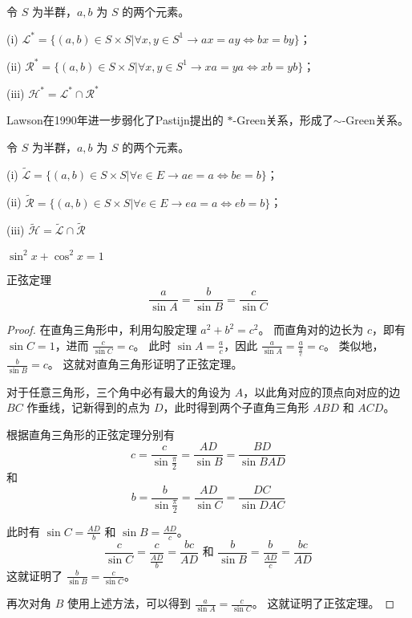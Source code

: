 \begin{definition}
    令 $S$ 为半群，$a, b$ 为 $S$ 的两个元素。

    (i) $\mathcal{L}^{\ast} = \{(a,b)\in S\times S| \forall x,y \in S^1 \rightarrow ax=ay \Leftrightarrow bx=by\}$；

    (ii) $\mathcal{R}^{\ast} = \{(a,b)\in S\times S| \forall x,y \in S^1 \rightarrow xa=ya \Leftrightarrow xb=yb\}$；

    (iii) $\mathcal{H}^{\ast} = \mathcal{L}^{\ast} \cap \mathcal{R}^{\ast}$
\end{definition}

Lawson在1990年进一步弱化了Pastijn提出的 $\ast$-Green关系，形成了$\sim$-Green关系。

\begin{definition}
    令 $S$ 为半群，$a, b$ 为 $S$ 的两个元素。

    (i) $\tilde{\mathcal{L}} = \{(a,b)\in S\times S| \forall e \in E \rightarrow ae=a \Leftrightarrow be=b\}$；

    (ii) $\tilde{\mathcal{R}} = \{(a,b)\in S\times S| \forall e \in E \rightarrow ea=a \Leftrightarrow eb=b\}$；

    (iii) $\tilde{\mathcal{H}} = \tilde{\mathcal{L}} \cap \tilde{\mathcal{R}}$
\end{definition}

\begin{axiom}
    $\sin^2 x + \cos^2 x = 1$
\end{axiom}

\begin{proposition} 正弦定理
    \[
        \frac{a}{\sin A} = \frac{b}{\sin B} = \frac{c}{\sin C}
    \]
    \begin{proof}
        在直角三角形中，利用勾股定理 $a^2 + b^2 = c^2$。
        而直角对的边长为 $c$，即有 $\sin C = 1$，进而 $\frac{c}{\sin C} = c$。
        此时 $\sin A = \frac{a}{c}$，因此 $\frac{a}{\sin A} = \frac{a}{\frac{a}{c}} = c$。
        类似地，$\frac{b}{\sin B} = c$。
        这就对直角三角形证明了正弦定理。

        对于任意三角形，三个角中必有最大的角设为 $A$，以此角对应的顶点向对应的边 $BC$ 作垂线，记新得到的点为 $D$，此时得到两个子直角三角形 $ABD$ 和 $ACD$。
        
        根据直角三角形的正弦定理分别有
        \[
            c = \frac{c}{\sin \frac{\pi}{2}} = \frac{AD}{\sin B} = \frac{BD}{\sin BAD}
        \]
        和
        \[
            b = \frac{b}{\sin \frac{\pi}{2}} = \frac{AD}{\sin C} = \frac{DC}{\sin DAC}
        \]
        
        此时有 $\sin C = \frac{AD}{b}$ 和 $\sin B = \frac{AD}{c}$。
        \[
            \frac{c}{\sin C} = \frac{c}{\frac{AD}{b}} = \frac{bc}{AD}
            \text{ 和 }
            \frac{b}{\sin B} = \frac{b}{\frac{AD}{c}} = \frac{bc}{AD}
        \]
        这就证明了 $\frac{b}{\sin B} = \frac{c}{\sin C}$。

        再次对角 $B$ 使用上述方法，可以得到 $\frac{a}{\sin A} = \frac{c}{\sin C}$。
        这就证明了正弦定理。
    \end{proof}
\end{proposition}

